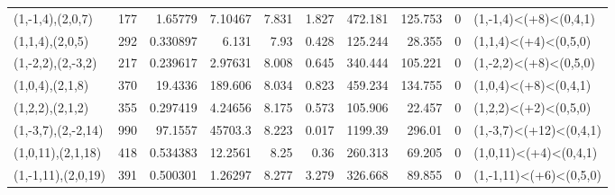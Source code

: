 \begin{tabular}{lrrrrrrrrl}
 (1,-1,4),(2,0,7)   &    177 &  1.65779  &     7.10467  &        7.831 &      1.827 &          472.181 &        125.753 &        0 & (1,-1,4)<(+8)<(0,4,1)  \\
 (1,1,4),(2,0,5)    &    292 &  0.330897 &     6.131    &        7.93  &      0.428 &          125.244 &         28.355 &        0 & (1,1,4)<(+4)<(0,5,0)   \\
 (1,-2,2),(2,-3,2)  &    217 &  0.239617 &     2.97631  &        8.008 &      0.645 &          340.444 &        105.221 &        0 & (1,-2,2)<(+8)<(0,5,0)  \\
 (1,0,4),(2,1,8)    &    370 & 19.4336   &   189.606    &        8.034 &      0.823 &          459.234 &        134.755 &        0 & (1,0,4)<(+8)<(0,4,1)   \\
 (1,2,2),(2,1,2)    &    355 &  0.297419 &     4.24656  &        8.175 &      0.573 &          105.906 &         22.457 &        0 & (1,2,2)<(+2)<(0,5,0)   \\
 (1,-3,7),(2,-2,14) &    990 & 97.1557   & 45703.3      &        8.223 &      0.017 &         1199.39  &        296.01  &        0 & (1,-3,7)<(+12)<(0,4,1) \\
 (1,0,11),(2,1,18)  &    418 &  0.534383 &    12.2561   &        8.25  &      0.36  &          260.313 &         69.205 &        0 & (1,0,11)<(+4)<(0,4,1)  \\
 (1,-1,11),(2,0,19) &    391 &  0.500301 &     1.26297  &        8.277 &      3.279 &          326.668 &         89.855 &        0 & (1,-1,11)<(+6)<(0,5,0) \\
\hline
\end{tabular}